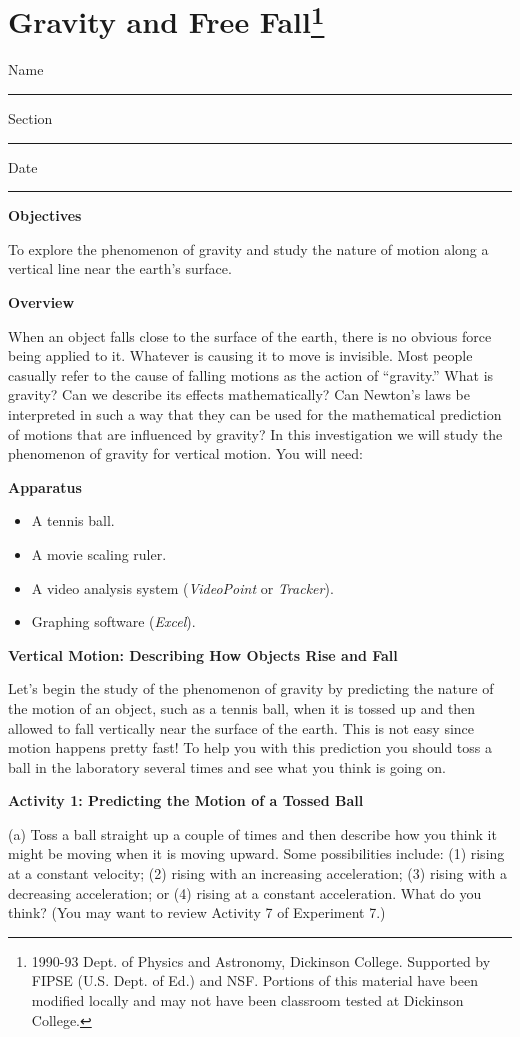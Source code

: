 
\section{Gravity and Free Fall\footnote{
1990-93 Dept. of Physics and Astronomy, Dickinson College. Supported by FIPSE
(U.S. Dept. of Ed.) and NSF. Portions of this material have been modified locally
and may not have been classroom tested at Dickinson College.
}}

Name \rule{2.0in}{0.1pt}\hfill{}Section \rule{1.0in}{0.1pt}\hfill{}Date \rule{1.0in}{0.1pt}

\textbf{Objectives }

To explore the phenomenon of gravity and study the nature of motion along a
vertical line near the earth's surface.

\textbf{Overview }

When an object falls close to the surface of the earth, there is no obvious
force being applied to it. Whatever is causing it to move is invisible. Most
people casually refer to the cause of falling motions as the action of 
``gravity.''
What is gravity? Can we describe its effects mathematically? Can Newton's laws
be interpreted in such a way that they can be used for the mathematical prediction
of motions that are influenced by gravity? In this investigation we will study
the phenomenon of gravity for vertical motion. You will need:

\textbf{Apparatus}

\begin{itemize}
\item A tennis ball. 
\item A movie scaling ruler.
\item A video analysis system (\textit{VideoPoint} or \textit{Tracker}). 
\item Graphing software (\textit{Excel}).
\end{itemize}
\textbf{Vertical Motion: Describing How Objects Rise and Fall }

Let's begin the study of the phenomenon of gravity by predicting the nature
of the motion of an object, such as a tennis ball, when it is tossed up and
then allowed to fall vertically near the surface of the earth. This is not easy
since motion happens pretty fast! To help you with this prediction you should
toss a ball in the laboratory several times and see what you think is going
on.

\textbf{Activity 1: Predicting the Motion of a Tossed Ball }

(a) Toss a ball straight up a couple of times and then describe how you think
it might be moving when it is moving upward. Some possibilities include: (1)
rising at a constant velocity; (2) rising with an increasing acceleration; (3)
rising with a decreasing acceleration; or (4) rising at a constant acceleration. What do you think? (You may want to review Activity 7 of Experiment 7.)
\vspace{20mm}


